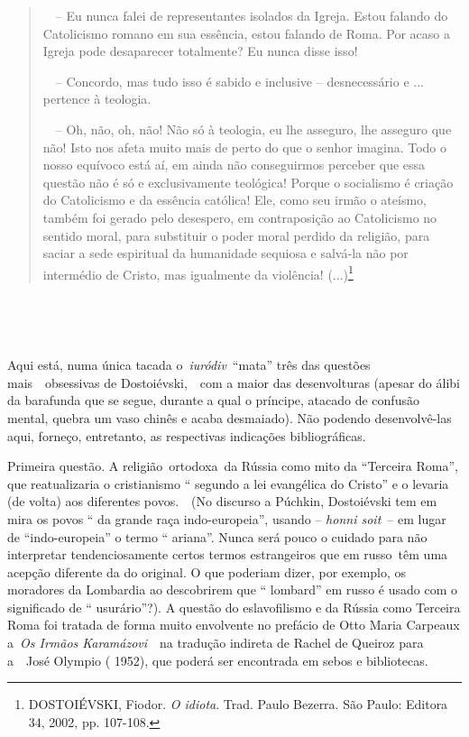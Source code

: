 \begin{quote}
~~-- Eu nunca falei de representantes isolados da Igreja. Estou falando
do Catolicismo romano em sua essência, estou falando de Roma. Por acaso
a Igreja pode desaparecer totalmente? Eu nunca disse isso!

~~-- Concordo, mas tudo isso é sabido e inclusive -- desnecessário e ...
pertence à teologia.

~~-- Oh, não, oh, não! Não só à teologia, eu lhe asseguro, lhe asseguro
que não! Isto nos afeta muito mais de perto do que o senhor imagina.
Todo o nosso equívoco está aí, em ainda não conseguirmos perceber que
essa questão não é só e exclusivamente teológica! Porque o socialismo é
criação do Catolicismo e da essência católica! Ele, como seu irmão o
ateísmo, também foi gerado pelo desespero, em contraposição ao
Catolicismo no sentido moral, para substituir o poder moral perdido da
religião, para saciar a sede espiritual da humanidade sequiosa e
salvá-la não por intermédio de Cristo, mas igualmente da violência!
(...)\footnote{DOSTOIÉVSKI, Fiodor. \emph{O idiota}. Trad. Paulo
  Bezerra. São Paulo: Editora 34, 2002, pp. 107-108.}
\end{quote}

\emph{~}

\emph{~}

Aqui está, numa única tacada o~\emph{iuródiv}~``mata'' três das questões
mais~~obsessivas de Dostoiévski,~~com a maior das desenvolturas (apesar
do álibi da barafunda que se segue, durante a qual o príncipe, atacado
de confusão mental, quebra um vaso chinês e acaba desmaiado). Não
podendo desenvolvê-las aqui, forneço, entretanto, as respectivas
indicações bibliográficas.

Primeira questão. A religião~ortodoxa~da Rússia como mito da ``Terceira
Roma'', que reatualizaria o cristianismo `` segundo a lei evangélica do
Cristo'' e o levaria (de volta) aos diferentes povos.~~(No discurso a
Púchkin, Dostoiévski tem em mira os povos `` da grande raça
indo-europeia'', usando -- \emph{honni soit}~-- em lugar de
``indo-europeia'' o termo `` ariana''. Nunca será pouco o cuidado para
não interpretar tendenciosamente certos termos estrangeiros que em
russo~têm uma acepção diferente da do original. O que poderiam dizer,
por exemplo, os moradores da Lombardia ao descobrirem que `` lombard''
em russo é usado com o significado de `` usurário''?). A questão do
eslavofilismo e da Rússia como Terceira Roma foi tratada de forma muito
envolvente no prefácio de Otto Maria Carpeaux a~\emph{Os Irmãos
Karamázovi}~~na tradução indireta de Rachel de Queiroz para a~~José
Olympio ( 1952), que poderá ser encontrada em sebos e bibliotecas.

